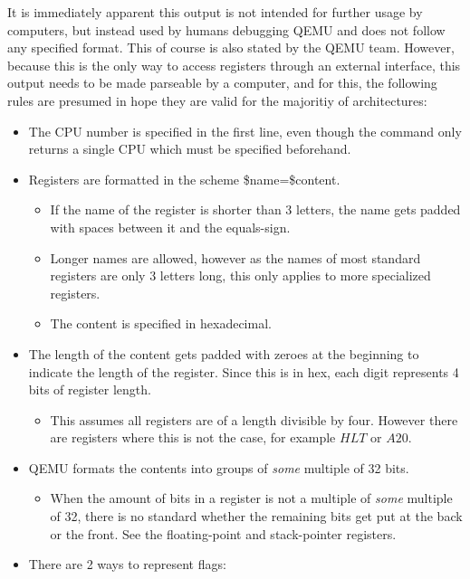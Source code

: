 It is immediately apparent this output is not intended for further usage by computers,
but instead used by humans debugging QEMU and does not follow any specified format.
This of course is also stated by the QEMU team\cite{qhm-documentation}.
However, because this is the only way to access registers through an external interface,
this output needs to be made parseable by a computer, and for this,
the following rules are presumed in hope they are valid for the majoritiy of architectures:

\begin{itemize}
  \item The CPU number is specified in the first line, even though the command only returns a single CPU which must be specified beforehand.
  \item Registers are formatted in the scheme \$name=\$content.
  \begin{itemize}
    \item If the name of the register is shorter than 3 letters, the name gets padded with spaces between it and the equals-sign.
    \item Longer names are allowed, however as the names of most standard registers are only 3 letters long, this only applies to more specialized registers.
    \item The content is specified in hexadecimal.
  \end{itemize}
  \item The length of the content gets padded with zeroes at the beginning to indicate the length of the register.
  Since this is in hex, each digit represents 4 bits of register length.
  \begin{itemize}
    \item This assumes all registers are of a length divisible by four.
    However there are registers where this is not the case, for example $HLT$ or $A20$.
  \end{itemize}
  \item QEMU formats the contents into groups of \emph{some} multiple of 32 bits.
  \begin{itemize}
    \item When the amount of bits in a register is not a multiple of \emph{some} multiple of 32,
    there is no standard whether the remaining bits get put at the back or the front.
    See the floating-point and stack-pointer registers.
  \end{itemize}
  \item There are 2 ways to represent flags:
  \begin{enumerate}

\end{enumerate}
\end{itemize}
